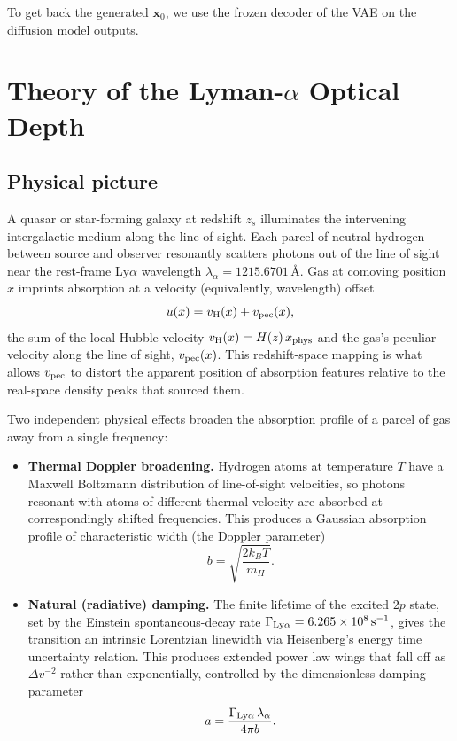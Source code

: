 \vspace{\baselineskip}

To get back the generated $\bm{x}_0$, we use the frozen decoder of the VAE on the diffusion model outputs.


\section{Theory of the Lyman-$\alpha$ Optical Depth}
\label{sec:lya-theory}


\subsection{Physical picture}
\label{sec:lya-physics}

A quasar or star-forming galaxy at redshift $z_s$ illuminates the intervening intergalactic medium along the line of sight. Each parcel of neutral hydrogen between source and observer resonantly scatters photons out of the line of sight near the rest-frame Ly$\alpha$ wavelength $\lambda_\alpha = 1215.6701\,\text{\AA}$. Gas at comoving position $x$ imprints absorption at a velocity (equivalently, wavelength) offset
\begin{equation}
u(x) = v_{\rm H}(x) + v_{\rm pec}(x),
\label{eq:redshift-space}
\end{equation}
the sum of the local Hubble velocity $v_{\rm H}(x)=H(z)\,x_{\rm phys}$ and the gas's peculiar velocity along the line of sight, $v_{\rm pec}(x)$. This redshift-space mapping is what allows $v_{\rm pec}$ to distort the apparent position of absorption features relative to the real-space density peaks that sourced them.

Two independent physical effects broaden the absorption profile of a parcel of gas away from a single frequency:

\begin{itemize}
\item \textbf{Thermal Doppler broadening.} Hydrogen atoms at temperature $T$ have a Maxwell Boltzmann distribution of line-of-sight velocities, so photons resonant with atoms of different thermal velocity are absorbed at correspondingly shifted frequencies. This produces a Gaussian absorption profile of characteristic width (the Doppler parameter)
\begin{equation}
b = \sqrt{\frac{2k_B T}{m_H}}.
\label{eq:doppler-b}
\end{equation}

\item \textbf{Natural (radiative) damping.} The finite lifetime of the excited $2p$ state, set by the Einstein spontaneous-decay rate $\Gamma_{\rm Ly\alpha}=6.265\times10^8\,{\rm s^{-1}}$, gives the transition an intrinsic Lorentzian linewidth via Heisenberg's energy time uncertainty relation. This produces extended power law wings that fall off as $\Delta v^{-2}$ rather than exponentially, controlled by the dimensionless damping parameter
\begin{equation}
a = \frac{\Gamma_{\rm Ly\alpha}\,\lambda_\alpha}{4\pi b}.
\label{eq:voigt-a}
\end{equation}
\end{itemize}

